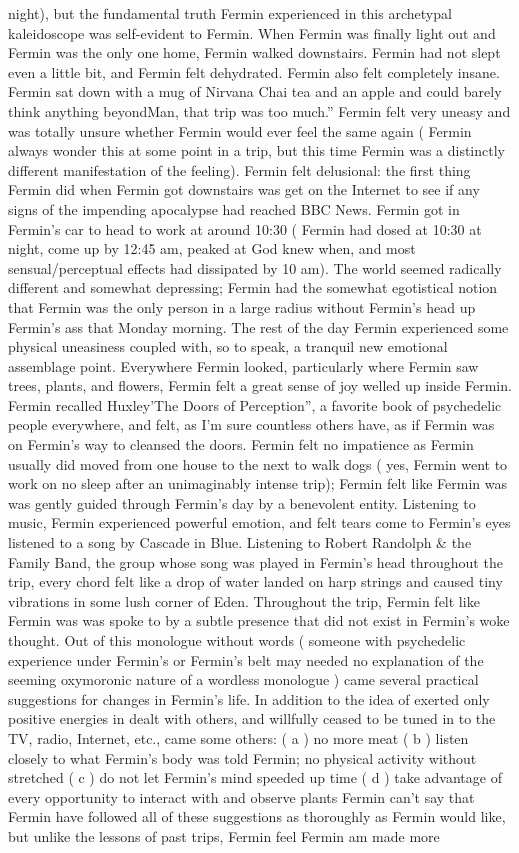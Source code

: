 \documentclass[12pt]{book}
\begin{document}
night), but the fundamental truth Fermin experienced in this archetypal kaleidoscope was self-evident to Fermin. When Fermin was finally light out and Fermin was the only one home, Fermin walked downstairs. Fermin had not slept even a little bit, and Fermin felt dehydrated. Fermin also felt completely insane. Fermin sat down with a mug of Nirvana Chai tea and an apple and could barely think anything beyondMan, that trip was too much.'' Fermin felt very uneasy and was totally unsure whether Fermin would ever feel the same again ( Fermin always wonder this at some point in a trip, but this time Fermin was a distinctly different manifestation of the feeling). Fermin felt delusional: the first thing Fermin did when Fermin got downstairs was get on the Internet to see if any signs of the impending apocalypse had reached BBC News. Fermin got in Fermin's car to head to work at around 10:30 ( Fermin had dosed at 10:30 at night, come up by 12:45 am, peaked at God knew when, and most sensual/perceptual effects had dissipated by 10 am). The world seemed radically different and somewhat depressing; Fermin had the somewhat egotistical notion that Fermin was the only person in a large radius without Fermin's head up Fermin's ass that Monday morning. The rest of the day Fermin experienced some physical uneasiness coupled with, so to speak, a tranquil new emotional assemblage point. Everywhere Fermin looked, particularly where Fermin saw trees, plants, and flowers, Fermin felt a great sense of joy welled up inside Fermin. Fermin recalled Huxley'The Doors of Perception'', a favorite book of psychedelic people everywhere, and felt, as I'm sure countless others have, as if Fermin was on Fermin's way to cleansed the doors. Fermin felt no impatience as Fermin usually did moved from one house to the next to walk dogs ( yes, Fermin went to work on no sleep after an unimaginably intense trip); Fermin felt like Fermin was was gently guided through Fermin's day by a benevolent entity. Listening to music, Fermin experienced powerful emotion, and felt tears come to Fermin's eyes listened to a song by Cascade in Blue. Listening to Robert Randolph \& the Family Band, the group whose song was played in Fermin's head throughout the trip, every chord felt like a drop of water landed on harp strings and caused tiny vibrations in some lush corner of Eden. Throughout the trip, Fermin felt like Fermin was was spoke to by a subtle presence that did not exist in Fermin's woke thought. Out of this monologue without words ( someone with psychedelic experience under Fermin's or Fermin's belt may needed no explanation of the seeming oxymoronic nature of a wordless monologue ) came several practical suggestions for changes in Fermin's life. In addition to the idea of exerted only positive energies in dealt with others, and willfully ceased to be tuned in to the TV, radio, Internet, etc., came some others: ( a ) no more meat ( b ) listen closely to what Fermin's body was told Fermin; no physical activity without stretched ( c ) do not let Fermin's mind speeded up time ( d ) take advantage of every opportunity to interact with and observe plants Fermin can't say that Fermin have followed all of these suggestions as thoroughly as Fermin would like, but unlike the lessons of past trips, Fermin feel Fermin am made more 
\end{document}
